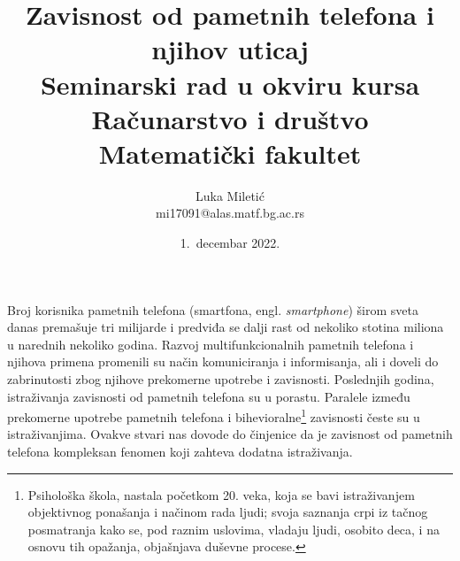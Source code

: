 \documentclass[a4paper]{article}
\begin{document}
\title{Zavisnost od pametnih telefona i njihov uticaj\\
	\small{Seminarski rad u okviru kursa \\
	       Računarstvo i društvo \\
	       Matematički fakultet }
	  }
\author{Luka Miletić \\ mi17091@alas.matf.bg.ac.rs}
\date{1.~decembar 2022.}
\maketitle

\abstract
Broj korisnika pametnih telefona (smartfona, engl. \textit{smartphone}) širom sveta danas premašuje tri milijarde
i predviđa se dalji rast od nekoliko stotina miliona u narednih nekoliko godina. Razvoj multifunkcionalnih
pametnih telefona i njihova primena promenili su način komuniciranja i informisanja, ali i doveli do
zabrinutosti zbog njihove prekomerne upotrebe i zavisnosti. Poslednjih godina, istraživanja zavisnosti od
pametnih telefona su u porastu. Paralele između prekomerne upotrebe pametnih telefona
i bihevioralne\footnote{Psihološka škola, nastala početkom 20. veka,
koja se bavi istraživanjem objektivnog
ponašanja i načinom rada ljudi;
svoja saznanja crpi iz tačnog posmatranja kako se, pod raznim uslovima, vladaju 
ljudi, osobito deca, i na osnovu tih opažanja, objašnjava duševne procese.}
zavisnosti česte su u istraživanjima.
Ovakve stvari nas dovode do činjenice da je zavisnost od pametnih
telefona kompleksan fenomen koji zahteva dodatna istraživanja.

\newpage
\tableofcontents
\newpage
\end{document}
